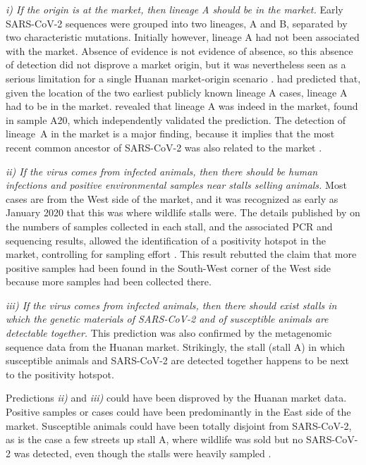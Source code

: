 \documentclass[11pt]{article}
\def \sct {\mbox{SARS-CoV-2}}
\begin{document}
\textit{i) If the origin is at the market, then lineage A should be in the market.}
Early SARS-CoV-2 sequences were grouped into two lineages, A and B, separated by two characteristic mutations. Initially however, lineage A had not been associated with the market. Absence of evidence is not evidence of absence, so this absence of detection did not disprove a market origin, but it was nevertheless seen as a serious limitation for a single Huanan market-origin scenario \citep{Zhang2020Nature, Bloom2021MBE}.  had predicted that, given the location of the two earliest publicly known lineage A cases, lineage A had to be in the market.  revealed that lineage A was indeed in the market, found in sample A20, which independently validated the prediction. The detection of lineage~A in the market is a major finding, because it implies that the most recent common ancestor of \sct{} was also related to the market \citep{Babar2022Zenodo}. 

\textit{ii) If the virus comes from infected animals, then there should be human infections and positive environmental samples near stalls selling animals.} 
Most cases are from the West side of the market, and it was recognized as early as January 2020 that this was where wildlife stalls were. The details published by \citet{Liu2023Nature} on the numbers of samples collected in each stall, and the associated PCR and sequencing results, allowed the identification of a positivity hotspot in the market, controlling for sampling effort \citep{ACC2023bioRxiv}. This result rebutted the claim that more positive samples had been found in the South-West corner of the West side because more samples had been collected there.

\textit{iii) If the virus comes from infected animals, then there should exist stalls in which the genetic materials of SARS-CoV-2 and of susceptible animals are detectable together.} 
This prediction was also confirmed by the metagenomic sequence data from the Huanan market. Strikingly, the stall (stall A) in which susceptible animals and \sct{} are detected together happens to be next to the positivity hotspot. 

Predictions \textit{ii)} and \textit{iii)} could have been disproved by the Huanan market data. Positive samples or cases could have been predominantly in the East side of the market. Susceptible animals could have been totally disjoint from \sct{}, as is the case a few streets up stall A, where wildlife was sold but no \sct{} was detected, even though the stalls were heavily sampled \citep{Liu2023Nature, ACC2023bioRxiv}.
\end{document}
